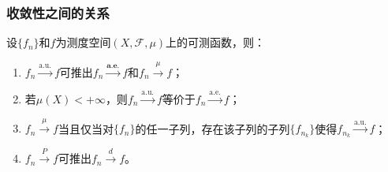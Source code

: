 \subsubsection{收敛性之间的关系}
\begin{theorem}\label{theo:a.e.a.u.mu.d}
	设$\{f_n\}$和$f$为测度空间$(X,\mathscr{F},\mu)$上的可测函数，则：
	\begin{enumerate}
		\item $f_n\overset{\text{a.u.}}{\longrightarrow}f$可推出$f_n\overset{\textbf{a.e.}}{\longrightarrow}f$和$f_n\overset{\mu}{\longrightarrow}f$；
		\item 若$\mu(X)<+\infty$，则$f_n\overset{\text{a.u.}}{\longrightarrow}f$等价于$f_n\overset{\text{a.e.}}{\longrightarrow}f$；
		\item $f_n\overset{\mu}{\longrightarrow}f$当且仅当对$\{f_n\}$的任一子列，存在该子列的子列$\{f_{n_k}\}$使得$f_{n_k}\overset{\text{a.u.}}{\longrightarrow}f$；
		\item $f_n\overset{P}{\longrightarrow}f$可推出$f_n\overset{d}{\longrightarrow}f$。
	\end{enumerate}
\end{theorem}
